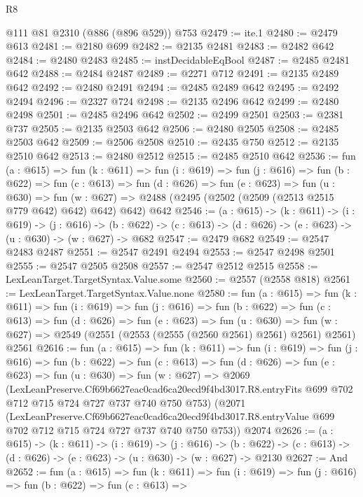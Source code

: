 \begin{lexlean}{R8}
\begin{coremodule}
    @111
    @81
    @2310
    (@886 (@896 @529))
    @753
@2479 := ite.{1}
@2480 := @2479 @613
@2481 := @2180 @699
@2482 := @2135 @2481
@2483 := @2482 @642
@2484 := @2480 @2483
@2485 := instDecidableEqBool
@2487 := @2485 @2481 @642
@2488 := @2484 @2487
@2489 := @2271 @712
@2491 := @2135 @2489 @642
@2492 := @2480 @2491
@2494 := @2485 @2489 @642
@2495 := @2492 @2494
@2496 := @2327 @724
@2498 := @2135 @2496 @642
@2499 := @2480 @2498
@2501 := @2485 @2496 @642
@2502 := @2499 @2501
@2503 := @2381 @737
@2505 := @2135 @2503 @642
@2506 := @2480 @2505
@2508 := @2485 @2503 @642
@2509 := @2506 @2508
@2510 := @2435 @750
@2512 := @2135 @2510 @642
@2513 := @2480 @2512
@2515 := @2485 @2510 @642
@2536 := fun (a : @615) =>
  fun (k : @611) =>
  fun (i : @619) =>
  fun (j : @616) =>
  fun (b : @622) =>
  fun (c : @613) =>
  fun (d : @626) =>
  fun (e : @623) =>
  fun (u : @630) =>
  fun (w : @627) => @2488 (@2495 (@2502 (@2509 (@2513 @2515 @779 @642) @642) @642) @642) @642
@2546 := (a : @615) ->
  (k : @611) ->
  (i : @619) ->
  (j : @616) ->
  (b : @622) -> (c : @613) -> (d : @626) -> (e : @623) -> (u : @630) -> (w : @627) -> @682
@2547 := @2479 @682
@2549 := @2547 @2483 @2487
@2551 := @2547 @2491 @2494
@2553 := @2547 @2498 @2501
@2555 := @2547 @2505 @2508
@2557 := @2547 @2512 @2515
@2558 := LexLeanTarget.TargetSyntax.Value.some
@2560 := @2557 (@2558 @818)
@2561 := LexLeanTarget.TargetSyntax.Value.none
@2580 := fun (a : @615) =>
  fun (k : @611) =>
  fun (i : @619) =>
  fun (j : @616) =>
  fun (b : @622) =>
  fun (c : @613) =>
  fun (d : @626) =>
  fun (e : @623) =>
  fun (u : @630) =>
  fun (w : @627) => @2549 (@2551 (@2553 (@2555 (@2560 @2561) @2561) @2561) @2561) @2561
@2616 := fun (a : @615) =>
  fun (k : @611) =>
  fun (i : @619) =>
  fun (j : @616) =>
  fun (b : @622) =>
  fun (c : @613) =>
  fun (d : @626) =>
  fun (e : @623) =>
  fun (u : @630) =>
  fun (w : @627) =>
  @2069
    (LexLeanPreserve.Cf69b6627eac0cad6ca20ecd9f4bd3017.R8.entryFits
      @699
      @702
      @712
      @715
      @724
      @727
      @737
      @740
      @750
      @753)
    (@2071
      (LexLeanPreserve.Cf69b6627eac0cad6ca20ecd9f4bd3017.R8.entryValue
        @699
        @702
        @712
        @715
        @724
        @727
        @737
        @740
        @750
        @753))
    @2074
@2626 := (a : @615) ->
  (k : @611) ->
  (i : @619) ->
  (j : @616) ->
  (b : @622) -> (c : @613) -> (d : @626) -> (e : @623) -> (u : @630) -> (w : @627) -> @2130
@2627 := And
@2652 := fun (a : @615) =>
  fun (k : @611) =>
  fun (i : @619) =>
  fun (j : @616) =>
  fun (b : @622) =>
  fun (c : @613) =>

\end{coremodule}
\end{lexlean}
